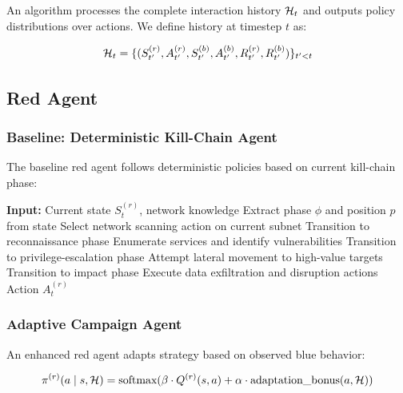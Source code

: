 \documentclass[12pt,twoside]{article}
\newcounter{phase}[algorithm]
\theoremstyle{definition}
\theoremstyle{plain}
\begin{document}
An algorithm processes the complete interaction history $\mathcal{H}_t$ and outputs policy distributions over actions. We define history at timestep $t$ as:

\begin{equation}
\mathcal{H}_t = \{(S_{t'}^{(r)}, A_{t'}^{(r)}, S_{t'}^{(b)}, A_{t'}^{(b)}, R_{t'}^{(r)}, R_{t'}^{(b)})\}_{t' < t}
\end{equation}

\subsection{Red Agent}

\subsubsection{Baseline: Deterministic Kill-Chain Agent}
The baseline red agent follows deterministic policies based on current kill-chain phase:

\begin{algorithm}
\caption{Deterministic Red Agent Policy}
\begin{algorithmic}[1]
\STATE \textbf{Input:} Current state $S_t^{(r)}$, network knowledge
\STATE Extract phase $\phi$ and position $p$ from state
    \STATE Select network scanning action on current subnet
        \STATE Transition to reconnaissance phase
    \ENDIF
{}
    \STATE Enumerate services and identify vulnerabilities
        \STATE Transition to privilege-escalation phase
    \ENDIF
{}
    \STATE Attempt lateral movement to high-value targets
        \STATE Transition to impact phase
    \ENDIF
{}
    \STATE Execute data exfiltration and disruption actions
\ENDIF
\RETURN Action $A_t^{(r)}$
\end{algorithmic}
\end{algorithm}

\subsubsection{Adaptive Campaign Agent}
An enhanced red agent adapts strategy based on observed blue behavior:

\begin{equation}
\pi^{(r)}(a \mid s, \mathcal{H}) = \text{softmax}(\beta \cdot Q^{(r)}(s, a) + \alpha \cdot \text{adaptation\_bonus}(a, \mathcal{H}))
\end{equation}
\end{document}
